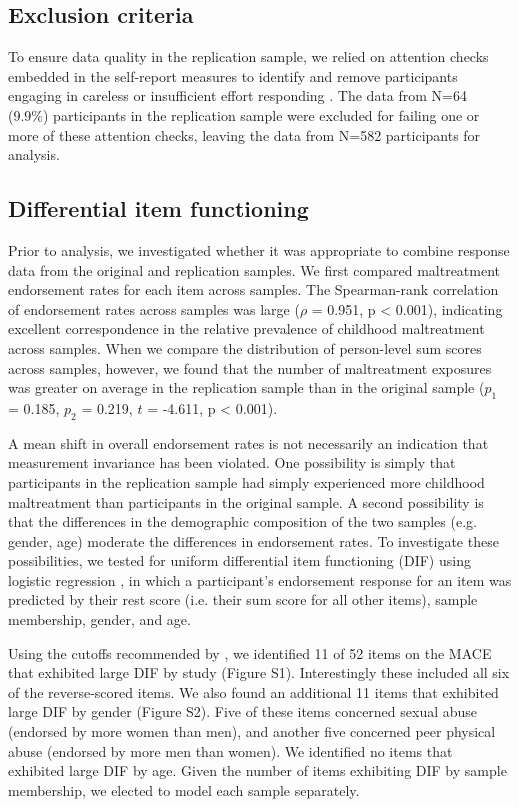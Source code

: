 \documentclass[letterpaper,man,natbib,floatsintext,longtable]{apa6}
\begin{document}
\subsection{Exclusion criteria}

To ensure data quality in the replication sample, we relied on attention checks embedded in the self-report measures to identify and remove participants engaging in careless or insufficient effort responding \citep{zorowitz2021inattentive}. The data from N=64 (9.9\%)  participants in the replication sample were excluded for failing one or more of these attention checks, leaving the data from N=582 participants for analysis.

\subsection{Differential item functioning}

Prior to analysis, we investigated whether it was appropriate to combine response data from the original and replication samples. We first compared maltreatment endorsement rates for each item across samples. The Spearman-rank correlation of endorsement rates across samples was large ($\rho$ = 0.951, p < 0.001), indicating excellent correspondence in the relative prevalence of childhood maltreatment across samples. When we compare the distribution of person-level sum scores across samples,  however, we found that the number of maltreatment exposures was greater on average in the replication sample than in the original sample ($p_1$ = 0.185, $p_2$ = 0.219, $t$ = -4.611, p < 0.001). 

A mean shift in overall endorsement rates is not necessarily an indication that measurement invariance has been violated. One possibility is simply that participants in the replication sample had simply experienced more childhood maltreatment than participants in the original sample. A second possibility is that the differences in the demographic composition of the two samples (e.g. gender, age) moderate the differences in endorsement rates. To investigate these possibilities, we tested for uniform differential item functioning (DIF) using logistic regression \citep{rogers1993comparison}, in which a participant's endorsement response for an item was predicted by their rest score (i.e. their sum score for all other items), sample membership, gender, and age. 

Using the cutoffs recommended by \cite{hidalgo2014binary}, we identified 11 of 52 items on the MACE that exhibited large DIF by study (Figure S1). Interestingly these included all six of the reverse-scored items. We also found an additional 11 items that exhibited large DIF by gender (Figure S2). Five of these items concerned sexual abuse (endorsed by more women than men), and another five concerned peer physical abuse (endorsed by more men than women). We identified no items that exhibited large DIF by age. Given the number of items exhibiting DIF by sample membership, we elected to model each sample separately.
\end{document}
